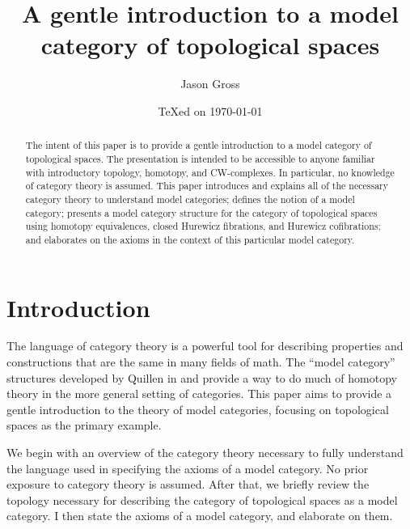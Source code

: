 \documentclass{amsart}
\theoremstyle{definition} \newaliasedtheorem{defn}[thm]{Definition}
\theoremstyle{definition} \newtheorem*{defn*}{Definition}
\theoremstyle{definition} \newaliasedtheorem{xca}[thm]{Exercise}
\theoremstyle{definition} \newtheorem*{soln*}{Solution}
\theoremstyle{definition} \newaliasedtheorem{remark}[thm]{Remark}
\theoremstyle{definition} \newtheorem*{remark*}{Remark}
\begin{document}
\title{A gentle introduction to a model category of topological spaces}
\author[J. Gross]{Jason Gross}
\address{Massachusetts Institute of Technology}
\date{\TeX ed on \today}

\begin{abstract}
  The intent of this paper is to provide a gentle introduction to a model category of topological spaces.  The presentation is intended to be accessible to anyone familiar with introductory topology, homotopy, and CW-complexes.  In particular, no knowledge of category theory is assumed.  This paper introduces and explains all of the necessary category theory to understand model categories; defines the notion of a model category; presents a model category structure for the category of topological spaces using homotopy equivalences, closed Hurewicz fibrations, and Hurewicz cofibrations; and elaborates on the axioms in the context of this particular model category.
\end{abstract}

\maketitle

\section{Introduction}
  The language of category theory is a powerful tool for describing properties and constructions that are the same in many fields of math.  The ``model category'' structures developed by Quillen in \cite{quillen1967homotopical} and \cite{quillen1969rational} provide a way to do much of homotopy theory in the more general setting of categories.  This paper aims to provide a gentle introduction to the theory of model categories, focusing on topological spaces as the primary example.
  
  We begin with an overview of the category theory necessary to fully understand the language used in specifying the axioms of a model category.  No prior exposure to category theory is assumed.  After that, we briefly review the topology necessary for describing the category of topological spaces as a model category.  I then state the axioms of a model category, and elaborate on them.
  
\end{document}
